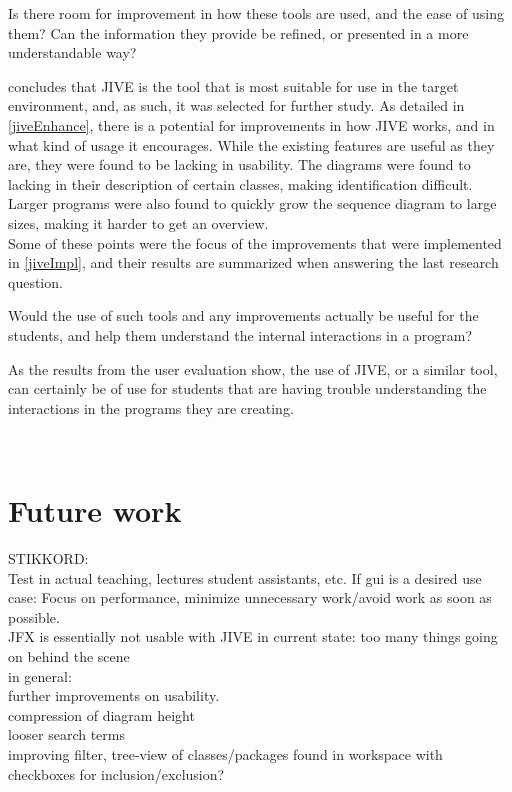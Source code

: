 \begin{theorem}
Is there room for improvement in how these tools are used, and the ease of using them? Can the information they provide be refined, or presented in a more understandable way?
\end{theorem}

 concludes that JIVE is the tool that is most suitable for use in the target environment, and, as such, it was selected for further study.
As detailed in \cref{jiveEnhance}, there is a potential for improvements in how JIVE works, and in what kind of usage it encourages.
While the existing features are useful as they are, they were found to be lacking in usability.
The diagrams were found to lacking in their description of certain classes, making identification difficult.
Larger programs were also found to quickly grow the sequence diagram to large sizes, making it harder to get an overview.
~\\

Some of these points were the focus of the improvements that were implemented in \cref{jiveImpl}, and their results are summarized when answering the last research question.
~\\

\begin{theorem}
Would the use of such tools and any improvements actually be useful for the students, and help them understand the internal interactions in a program?
\end{theorem}

As the results from the user evaluation show, the use of JIVE, or a similar tool, can certainly be of use for students that are having trouble understanding the interactions in the programs they are creating. %

~\\

\section{Future work}\label{conclusionFuture}
STIKKORD:\\
Test in actual teaching, lectures student assistants, etc.
If gui is a desired use case: Focus on performance, minimize unnecessary work/avoid work as soon as possible.\\
JFX is essentially not usable with JIVE in current state: too many things going on behind the scene\\

in general:\\
further improvements on usability.\\
compression of diagram height\\
looser search terms\\
improving filter, tree-view of classes/packages found in workspace with checkboxes for inclusion/exclusion?\\

